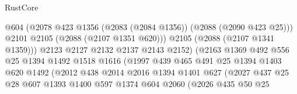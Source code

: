 \begin{lexlean}{RustCore}
\begin{coremodule}
                                        @604
                                        (@2078
                                          @423
                                          @1356
                                          (@2083 (@2084 @1356))
                                          (@2088 (@2090 @423 @25)))
                                        @2101
                                        @2105
                                        (@2088 (@2107 @1351 @620)))
                                      @2105
                                      (@2088 (@2107 @1341 @1359)))
                                    @2123
                                    @2127
                                    @2132
                                    @2137
                                    @2143
                                    @2152)
                                  (@2163
                                    @1369
                                    @492
                                    @556
                                    @25
                                    @1394
                                    @1492
                                    @1518
                                    @1616
                                    (@1997
                                      @439
                                      @465
                                      @491
                                      @25
                                      @1394
                                      @1403
                                      @620
                                      @1492
                                      (@2012
                                        @438
                                        @2014
                                        @2016
                                        @1394
                                        @1401
                                        @627
                                        (@2027
                                          @437
                                          @25
                                          @28
                                          @607
                                          @1393
                                          @1400
                                          @597
                                          @1374
                                          @604
                                          @2060
                                          (@2026
                                            @435
                                            @50
                                            @25

\end{coremodule}
\end{lexlean}
